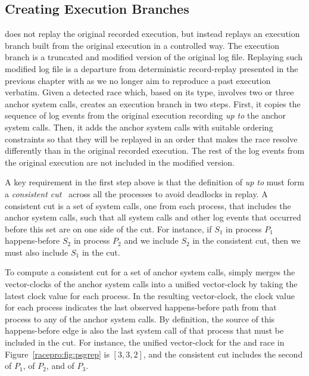 \subsection{Creating Execution Branches}  \label{racepro:sec:branches}

\racepro does not replay the original recorded execution, but
instead replays an execution branch built from the original execution
in a controlled way. The execution branch is a truncated and modified version of
the original log file. Replaying such modified log file is a departure from
deterministic record-replay presented in the previous chapter with
\scribe as we no longer aim to reproduce a past execution verbatim.
Given a detected race which, based
on its type, involves two or three anchor system calls, \racepro creates an
execution branch in two steps.  First, it copies the sequence of
log events from the original execution recording \emph{up to} the anchor
system calls.  Then, it adds the anchor system calls with suitable
ordering constraints so that they will be replayed in an order that makes
the race resolve differently than in the original recorded execution.
The rest of the log events from the original execution are not
included in the modified version.

A key requirement in the first step above is that the definition of
\emph{up to} must form a \emph{consistent cut}~\cite{vectorclock}
across all the processes to avoid deadlocks in replay.  A consistent
cut is a set of system calls, one from each process, that includes the
anchor system calls, such that all system calls and other log events
that occurred before this set are on one side of the cut.  For
instance, if $S_1$ in process $P_1$ happens-before $S_2$ in process
$P_2$ and we include $S_2$ in the consistent cut, then we must also
include $S_1$ in the cut.

To compute a consistent cut for a set of anchor system calls,
\racepro simply merges the vector-clocks of the anchor system calls into
a unified vector-clock by taking the latest clock value for each
process.  In the resulting vector-clock, the clock value for each
process indicates the last observed happens-before path from that process
to any of the anchor system calls.  By definition, the source of this
happens-before edge is also the last system call of that process that must
be included in the cut.  For instance, the unified vector-clock for the
 and 
race in Figure~\ref{racepro:fig:psgrep} is $[3,3,2]$, and the consistent cut
includes the second  of $P_1$,  of $P_2$, and
 of $P_3$.

